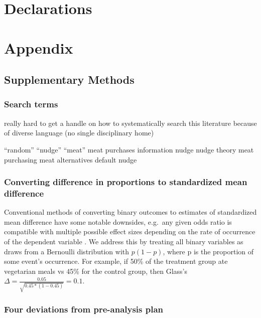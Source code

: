 \documentclass[sn-nature,pdflatex]{sn-jnl}
\begin{document}
\section*{Declarations}\label{declarations}

\newpage

\section{Appendix}\label{appendix}

\subsection{Supplementary Methods}\label{supplementary-methods}

\subsubsection{Search terms}\label{search-terms}

really hard to get a handle on how to systematically search this
literature because of diverse language (no single disciplinary home)

``random'' ``nudge'' ``meat'' meat purchases information nudge nudge
theory meat purchasing meat alternatives default nudge

\subsubsection{Converting difference in proportions to standardized mean
difference}\label{converting-difference-in-proportions-to-standardized-mean-difference}

Conventional methods of converting binary outcomes to estimates of
standardized mean difference have some notable downsides, e.g.~any given
odds ratio is compatible with multiple possible effect sizes depending
on the rate of occurrence of the dependent variable \citep{gomila2021}.
We address this by treating all binary variables as draws from a
Bernoulli distribution with \(p(1 - p)\), where p is the proportion of
some event's occurrence. For example, if 50\% of the treatment group ate
vegetarian meals vs 45\% for the control group, then Glass's
\(\Delta = \frac{0.05}{\sqrt{0.45 * (1-0.45)}} = 0.1\).

\subsubsection{Four deviations from pre-analysis
plan}\label{four-deviations-from-pre-analysis-plan}
\end{document}
